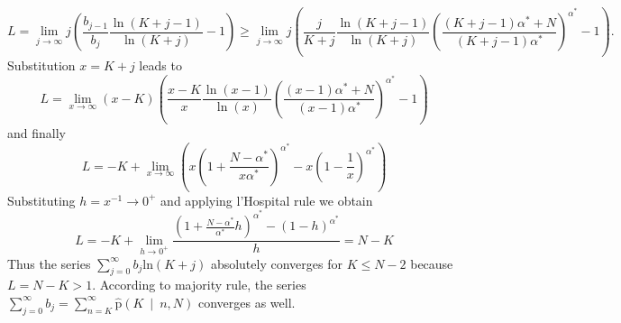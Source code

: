 \begin{equation}
L = \lim_{j \to \infty} j \left( \frac{b_{j-1}}{b_{j}} \frac{\ln(K+j-1)}{\ln(K+j)}   - 1   \right) \geq \lim_{j \to \infty} j \left( \frac{j}{K+j} \frac{\ln(K+j-1)}{\ln(K+j)} {\left( \frac{(K+j-1)\alpha^* + N}{(K+j-1)\alpha^* } \right)}^{\alpha^{*}} - 1   \right).
\end{equation}
Substitution $x=K+j$ leads to
\begin{equation}
L = \lim_{x \to \infty} (x-K)  \left( \frac{x-K}{x} \frac{\ln(x-1)}{\ln(x)} {\left( \frac{(x-1)\alpha^* + N}{(x-1)\alpha^*} \right)}^{\alpha^{*}} - 1   \right)
\end{equation}
and finally
\begin{equation}
L = -K + \lim_{x \to \infty} \left( x{\left( 1 + \frac{N-\alpha^{*}}{x\alpha^{*}} \right)}^{\alpha^{*}} -x{\left( 1 - \frac{1}{x} \right)}^{\alpha^{*}} \right)
\end{equation}
Substituting $h = x^{-1} \to 0^{+}$ and applying l'Hospital rule we obtain
\begin{equation}
L = -K + \lim_{h \to 0^{+}} \frac{ \left( 1+\frac{N-\alpha^{*}}{\alpha^{*}}h \right)^{\alpha^{*}} - {(1-h)}^{\alpha^{*}}}{h}  = N-K
\end{equation}
Thus the series $\sum_{j=0}^{\infty}{b_j \mathrm{ln}(K+j)} $ absolutely converges for  $K \leq N-2$ because $L = N-K > 1$.
According to majority rule, the series $\sum_{j=0}^{\infty}{b_j} = \sum_{n=K}^{\infty}{\mathrm{\hat{p}}\left(K \: \middle| \: n,N\right)}$ converges as well.